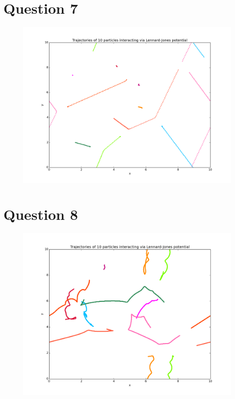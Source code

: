 \documentclass[a4paper,12pt]{article}
\begin{document}
\section{Question 7}

\begin{figure}[H]
\centering
\includegraphics[width = \linewidth]{lab6q7_5.png}
\caption{}
\label{fig:q7}
\end{figure}

\section{Question 8}

\begin{figure}[H]
\centering
\includegraphics[width = \linewidth]{lab6q8.png}
\caption{}
\label{fig:q8}
\end{figure}
\end{document}
